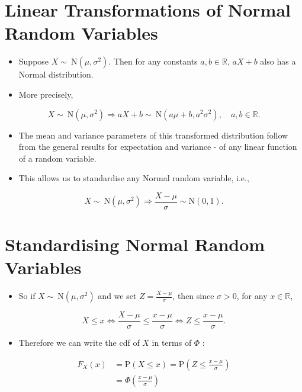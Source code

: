\documentclass[10pt]{article}
\begin{document}
\section*{Linear Transformations of Normal Random Variables}
\begin{itemize}
  \item Suppose $X \sim \mathrm{~N}\left(\mu, \sigma^{2}\right)$. Then for any constants $a, b \in \mathbb{R}$, $a X+b$ also has a Normal distribution.
  \item More precisely,
\end{itemize}

$$
X \sim \mathrm{~N}\left(\mu, \sigma^{2}\right) \Rightarrow a X+b \sim \mathrm{~N}\left(a \mu+b, a^{2} \sigma^{2}\right), \quad a, b \in \mathbb{R} .
$$

\begin{itemize}
  \item The mean and variance parameters of this transformed distribution follow from the general results for expectation and variance - of any linear function of a random variable.
  \item This allows us to standardise any Normal random variable, i.e.,
\end{itemize}

$$
X \sim \mathrm{~N}\left(\mu, \sigma^{2}\right) \Rightarrow \frac{X-\mu}{\sigma} \sim \mathrm{N}(0,1) .
$$

\section*{Standardising Normal Random Variables}
\begin{itemize}
  \item So if $X \sim \mathrm{~N}\left(\mu, \sigma^{2}\right)$ and we set $Z=\frac{X-\mu}{\sigma}$, then since $\sigma>0$, for any $x \in \mathbb{R}$,
\end{itemize}

$$
X \leq x \Longleftrightarrow \frac{X-\mu}{\sigma} \leq \frac{x-\mu}{\sigma} \Longleftrightarrow Z \leq \frac{x-\mu}{\sigma} .
$$

\begin{itemize}
  \item Therefore we can write the cdf of $X$ in terms of $\Phi$ :
\end{itemize}

$$
\begin{aligned}
F_{X}(x) & =\mathrm{P}(X \leq x)=\mathrm{P}\left(Z \leq \frac{x-\mu}{\sigma}\right) \\
& =\Phi\left(\frac{x-\mu}{\sigma}\right)
\end{aligned}
$$
\end{document}
